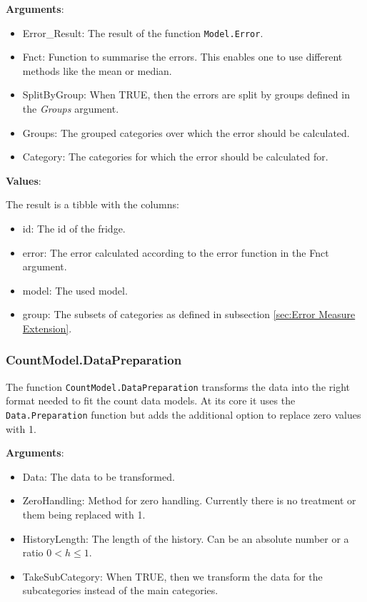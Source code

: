 \textbf{Arguments}:

\begin{itemize}
	\item Error\_Result: The result of the function \texttt{Model.Error}.
	\item Fnct: Function to summarise the errors. This enables one to use different methods like the mean or median. 
	\item SplitByGroup: When TRUE, then the errors are split by groups defined in the \textit{Groups} argument. 
	\item Groups: The grouped categories over which the error should be calculated. 
	\item Category: The categories for which the error should be calculated for.
\end{itemize}

\textbf{Values}:

The result is a tibble with the columns:
\begin{itemize}
	\item id: The id of the fridge. 
	\item error: The error calculated according to the error function in the Fnct argument. 
	\item model: The used model. 
	\item group: The subsets of categories as defined in subsection \ref{sec:Error Measure Extension}.
\end{itemize}


\subsubsection{CountModel.DataPreparation}
\label{sec:CountModel.DataPreparation}

The function \texttt{CountModel.DataPreparation} transforms the data into the right format needed to fit the count data models. At its core it uses the \texttt{Data.Preparation} function but adds the additional option to replace zero values with 1. 

\textbf{Arguments}:

\begin{itemize}
	\item Data: The data to be transformed.
	\item ZeroHandling: Method for zero handling. Currently there is no treatment or them being replaced with 1. 
	\item HistoryLength: The length of the history. Can be an absolute number or a ratio $0<h\leq 1$. 
	\item TakeSubCategory: When TRUE, then we transform the data for the subcategories instead of the main categories. 
\end{itemize}

